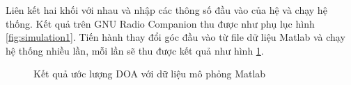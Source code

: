 Liên kết hai khối với nhau và nhập các thông số đầu vào của hệ và chạy hệ thống. Kết quả trên GNU Radio Companion thu được như phụ lục hình \ref{fig:simulation1}. Tiến hành thay đổi góc đầu vào từ file dữ liệu Matlab và chạy hệ thống nhiều lần, mỗi lần sẽ thu được kết quả như hình \ref{fig:simulation2}.
\begin{figure}[!h]
{}
\hfill
{}
\hfill
\caption{Kết quả ước lượng DOA với dữ liệu mô phỏng Matlab}
\label{fig:simulation2}
\end{figure}

